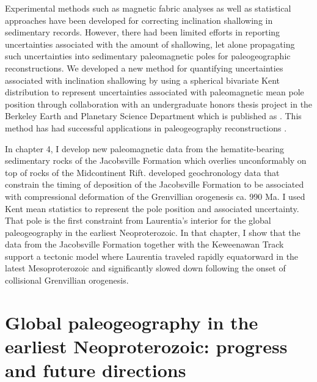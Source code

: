 Experimental methods such as magnetic fabric analyses \cite[e.g.][]{Kodama1995a, Bilardello2010a, Bilardello2010c, Bilardello2010b} as well as statistical approaches \cite[e.g.][]{Tauxe2004b} have been developed for correcting inclination shallowing in sedimentary records. However, there had been limited efforts in reporting uncertainties associated with the amount of shallowing, let alone propagating such uncertainties into sedimentary paleomagnetic poles for paleogeographic reconstructions. We developed a new method for quantifying uncertainties associated with inclination shallowing by using a spherical bivariate Kent distribution to represent uncertainties associated with paleomagnetic mean pole position through collaboration with an undergraduate honors thesis project in the Berkeley Earth and Planetary Science Department which is published as \cite{Pierce2022a}. This method has had successful applications in paleogeography reconstructions \citep{Slotznick2023a, Vaes2023a, Zhang2024a}. 

In chapter 4, I develop new paleomagnetic data from the hematite-bearing sedimentary rocks of the Jacobsville Formation which overlies unconformably on top of rocks of the Midcontinent Rift. \cite{Hodgin2022a} developed geochronology data that constrain the timing of deposition of the Jacobsville Formation to be associated with compressional deformation of the Grenvillian orogenesis ca. 990 Ma. I used Kent mean statistics to represent the pole position and associated uncertainty. That pole is the first constraint from Laurentia's interior for the global paleogeography in the earliest Neoproterozoic. In that chapter, I show that the data from the Jacobsville Formation together with the Keweenawan Track support a tectonic model where Laurentia traveled rapidly equatorward in the latest Mesoproterozoic and significantly slowed down following the onset of collisional Grenvillian orogenesis. 

\section{Global paleogeography in the earliest Neoproterozoic: progress and future directions}

